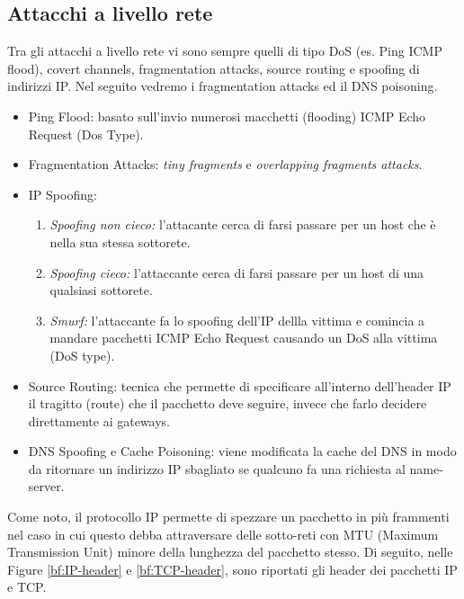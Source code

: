 \subsection{Attacchi a livello rete}
Tra gli attacchi a livello rete vi sono sempre quelli di tipo DoS (es. Ping ICMP flood), covert channels, fragmentation attacks, source routing e spoofing di indirizzi IP. Nel seguito vedremo i fragmentation attacks ed il DNS poisoning.
\begin{itemize}
\item Ping Flood: basato sull'invio numerosi macchetti (flooding) ICMP Echo Request (Dos Type).
\item Fragmentation Attacks: \textit{tiny fragments} e \textit{overlapping fragments attacks}.
\item IP Spoofing:
	\begin{enumerate} 
   	 \item \textit{Spoofing non cieco:} l'attacante cerca di farsi passare per un host che è nella sua stessa sottorete.
   	 \item \textit{Spoofing cieco:} l'attaccante cerca di farsi passare per un host di una qualsiasi sottorete.
   	 \item \textit{Smurf:} l'attaccante fa lo spoofing dell'IP dellla vittima e comincia a mandare pacchetti ICMP Echo Request causando un DoS alla vittima (DoS 			 				type).
   	 \end{enumerate}
\item Source Routing: tecnica che permette di specificare all'interno dell'header IP il tragitto (route) che il pacchetto deve seguire, invece che farlo decidere direttamente ai gateways.
\item DNS Spoofing e Cache Poisoning: viene modificata la cache del DNS in modo da ritornare un indirizzo IP sbagliato se qualcuno fa una richiesta al name-server.
\end{itemize}

Come noto, il protocollo IP permette di spezzare un pacchetto in più frammenti nel caso in cui questo debba attraversare delle sotto-reti con MTU (Maximum Transmission Unit) minore della lunghezza del pacchetto stesso. Di seguito, nelle Figure \ref{bf:IP-header} e \ref{bf:TCP-header}, sono riportati gli header dei pacchetti IP e TCP.

